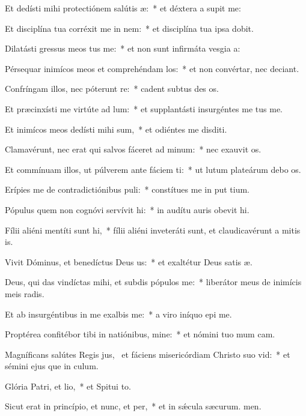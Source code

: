 \item Et dedísti mihi protectiónem salútis æ:~* et déxtera a supit me:
\item Et disciplína tua corréxit me in nem:~* et disciplína tua ipsa  dobit.
\item Dilatásti gressus meos tus me:~* et non sunt infirmáta vesgia a:
\item Pérsequar inimícos meos et comprehéndam los:~* et non convértar, nec deciant.
\item Confríngam illos, nec póterunt re:~* cadent subtus des os.
\item Et præcinxísti me virtúte ad lum:~* et supplantásti insurgéntes  me tus me.
\item Et inimícos meos dedísti mihi sum,~* et odiéntes me disditi.
\item Clamavérunt, nec erat qui salvos fáceret ad minum:~* nec exauvit os.
\item Et commínuam illos, ut púlverem ante fáciem ti:~* ut lutum plateárum debo os.
\item Erípies me de contradictiónibus puli:~* constítues me in put tium.
\item Pópulus quem non cognóvi servívit hi:~* in audítu auris obevit hi.
\item Fílii aliéni mentíti sunt hi,~* fílii aliéni inveteráti sunt, et claudicavérunt a mitis is.
\item Vivit Dóminus, et benedíctus Deus us:~* et exaltétur Deus satis æ.
\item Deus, qui das vindíctas mihi, et subdis pópulos  me:~* liberátor meus de inimícis meis radis.
\item Et ab insurgéntibus in me exalbis me:~* a viro iníquo epi me.
\item Proptérea confitébor tibi in natiónibus, mine:~* et nómini tuo mum cam.
\item Magníficans salútes Regis jus,~\pscross{} et fáciens misericórdiam Christo suo vid:~* et sémini ejus que in culum.
\item Glória Patri, et lio,~* et Spitui to.
\item Sicut erat in princípio, et nunc, et per,~* et in sǽcula sæcurum. men.
